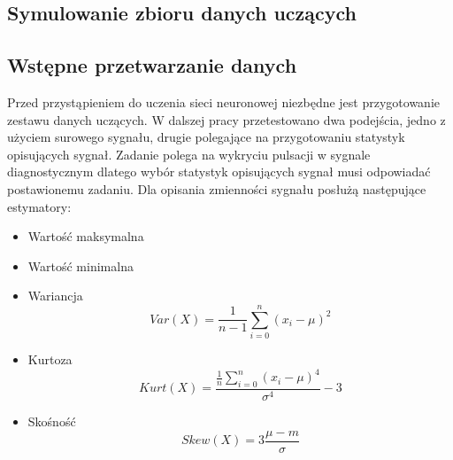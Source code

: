 \documentclass[12pt, a4paper, oneside]{article}
\begin{document}
	\subsection{Symulowanie zbioru danych uczących} 
	
	\subsection{Wstępne przetwarzanie danych}
	Przed przystąpieniem do uczenia sieci neuronowej niezbędne jest przygotowanie zestawu danych uczących. W dalszej pracy przetestowano dwa podejścia, jedno z użyciem surowego sygnału, drugie polegające na przygotowaniu statystyk opisujących sygnał. Zadanie polega na wykryciu pulsacji w sygnale diagnostycznym dlatego wybór statystyk opisujących sygnał musi odpowiadać postawionemu zadaniu. Dla opisania zmienności sygnału posłużą następujące estymatory:
	\begin{itemize}
		\item Wartość maksymalna
		\item Wartość minimalna
		\item Wariancja
		\begin{equation}
			Var (X) = \frac{1}{n-1} \sum_{i=0}^{n} \left(x_{i} - \mu\right)^{2}
		\end{equation}
		\item Kurtoza
		\begin{equation}
			Kurt (X) = \frac{\frac{1}{n} \sum_{i=0}^{n}\left(x_{i} - \mu\right)^{4}}{\sigma^{4}} - 3
		\end{equation}
		\item Skośność
		\begin{equation}
			Skew (X) = 3 \frac{\mu - m}{\sigma}
		\end{equation}
	\end{itemize}

	
	
\end{document}
